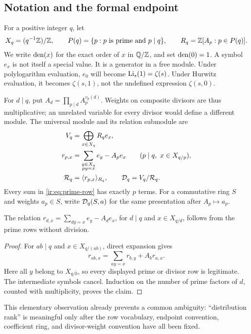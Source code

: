 \subsection{Notation and the formal endpoint}
For a positive integer $q$, let
\[
 X_q=(q^{-1}\mathbb Z)/\mathbb Z,\qquad P(q)=\{p:p\text{ is prime and }p\mid q\},
 \qquad R_q=\mathbb Z[A_p:p\in P(q)].
\]
We write $\operatorname{den}(x)$ for the exact order of $x$ in $\mathbb Q/\mathbb Z$, and set
$\operatorname{den}(0)=1$. A symbol $e_x$ is not itself a special value. It is a generator
in a free module. Under polylogarithm evaluation, $e_0$ will become
$\operatorname{Li}_s(1)=\zeta(s)$. Under Hurwitz evaluation, it becomes
$\zeta(s,1)$, not the undefined expression $\zeta(s,0)$.

For $d\mid q$, put $A_d=\prod_{p\mid d}A_p^{v_p(d)}$.
Weights on composite divisors are thus multiplicative; an unrelated
variable for every divisor would define a different module. The universal
module and its relation submodule are
\begin{align}
 V_q&=\bigoplus_{x\in X_q}R_qe_x,\\
 r_{p,x}&=\sum_{\substack{y\in X_q\\py=x}}e_y-A_pe_x
       \qquad(p\mid q,\ x\in X_{q/p}),\label{ir:eq:prime-row}\\
 \mathcal R_q&=\langle r_{p,x}\rangle_{R_q},\qquad
 \mathcal D_q=V_q/\mathcal R_q.\label{ir:eq:module}
\end{align}
Every sum in \eqref{ir:eq:prime-row} has exactly $p$ terms. For a
commutative ring $S$ and weights $a_p\in S$, write $\mathcal D_q(S,a)$ for the
same presentation after $A_p\mapsto a_p$.

\begin{lemma}\label{ir:lem:divisor}
The relation $r_{d,x}=\sum_{dy=x}e_y-A_de_x$, for $d\mid q$ and
$x\in X_{q/d}$, follows from the prime rows without division.
\end{lemma}
\begin{proof}
For $ab\mid q$ and $x\in X_{q/(ab)}$, direct expansion gives
\[
 r_{ab,x}=\sum_{ay=x}r_{b,y}+A_b r_{a,x}.
\]
Here all $y$ belong to $X_{q/b}$, so every displayed prime or divisor
row is legitimate. The intermediate symbols cancel. Induction on the
number of prime factors of $d$, counted with multiplicity, proves the
claim.
\end{proof}

This elementary observation already prevents a common ambiguity:
``distribution rank'' is meaningful only after the row vocabulary,
endpoint convention, coefficient ring, and divisor-weight convention
have all been fixed.
